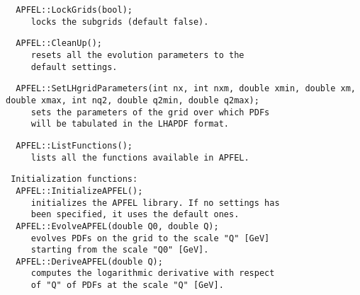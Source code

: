\documentclass[11pt,a4paper]{article}
\begin{document}
\begin{lstlisting}
  APFEL::LockGrids(bool);
     locks the subgrids (default false).
\end{lstlisting}
\begin{lstlisting}
  APFEL::CleanUp();
     resets all the evolution parameters to the
     default settings.
\end{lstlisting}
\begin{lstlisting}
  APFEL::SetLHgridParameters(int nx, int nxm, double xmin, double xm, double xmax, int nq2, double q2min, double q2max);
     sets the parameters of the grid over which PDFs
     will be tabulated in the LHAPDF format.
\end{lstlisting}
\begin{lstlisting}
  APFEL::ListFunctions();
     lists all the functions available in APFEL.
\end{lstlisting}




\begin{lstlisting}
 Initialization functions: 
  APFEL::InitializeAPFEL();
     initializes the APFEL library. If no settings has
     been specified, it uses the default ones.
  APFEL::EvolveAPFEL(double Q0, double Q);
     evolves PDFs on the grid to the scale "Q" [GeV]
     starting from the scale "Q0" [GeV].
  APFEL::DeriveAPFEL(double Q);
     computes the logarithmic derivative with respect
     of "Q" of PDFs at the scale "Q" [GeV].
\end{lstlisting}
\end{document}

